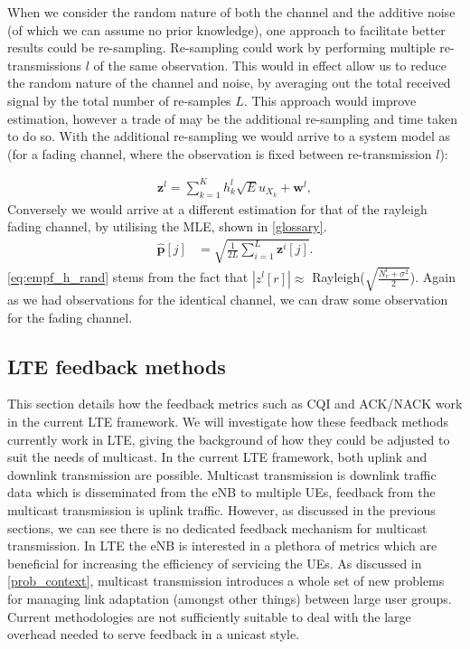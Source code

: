 \documentclass{article}
\begin{document}
When we consider the random nature of both the channel and the additive noise (of which we can assume no prior knowledge), one approach to facilitate better results could be re-sampling. Re-sampling could work by performing multiple re-transmissions $l$ of the same observation. This would in effect allow us to reduce the random nature of the channel and noise, by averaging out the total received signal by the total number of re-samples $L$. This approach would improve estimation, however a trade of may be the additional re-sampling and time taken to do so. With the additional re-sampling we would arrive to a system model as (for a fading channel, where the observation is fixed between re-transmission $l$):

\begin{align}
    \boldsymbol{z}^l = \sum_{k=1}^K h_k^l  \sqrt{E}u_{X_k} + \boldsymbol{w}^l, \label{eq:system_model_retrans}
\end{align}
Conversely we would arrive at a different estimation for that of the rayleigh fading channel, by utilising the \ac{MLE}, shown in \cref{glossary}.
\begin{align}
    \boldsymbol{\hat{p}}[j] &= \sqrt{\frac{1}{2L} \sum_{i = 1}^{L}\boldsymbol{z}^i[j]}.\label{eq:empf_h_rand}
\end{align}
\cref{eq:empf_h_rand} stems from the fact that $|z^l[r]| \approx$ Rayleigh($\sqrt{\frac{N_{r}^l + \sigma^2}{2}}$). Again as we had observations for the identical channel, we can draw some observation for the fading channel.

\subsection{LTE feedback methods}\label{lte_feedback_current}

This section details how the feedback metrics such as \ac{CQI} and ACK/NACK work in the current LTE framework. We will investigate how these feedback methods currently work in LTE, giving the background of how they could be adjusted to suit the needs of multicast. In the current LTE framework, both uplink and downlink transmission are possible. Multicast transmission is downlink traffic data which is disseminated from the eNB to multiple UEs, feedback from the multicast transmission is uplink traffic. However, as discussed in the previous sections, we can see there is no dedicated feedback mechanism for multicast transmission. In LTE the eNB is interested in a plethora of metrics which are beneficial for increasing the efficiency of servicing the UEs. As discussed in \cref{prob_context}, multicast transmission introduces a whole set of new problems for managing link adaptation (amongst other things) between large user groups. Current methodologies are not sufficiently suitable to deal with the large overhead needed to serve feedback in a unicast style.
\end{document}
